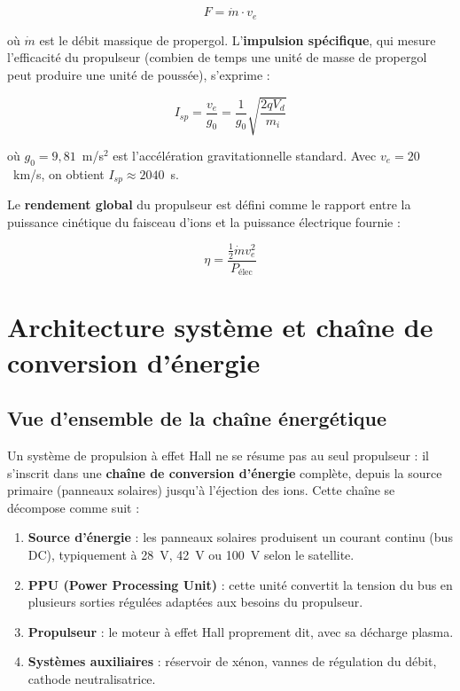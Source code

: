 \documentclass[12pt,a4paper]{article}
\begin{document}
\begin{equation}
F = \dot{m} \cdot v_e
\end{equation}

où $\dot{m}$ est le débit massique de propergol. L'\textbf{impulsion spécifique}, qui mesure l'efficacité du propulseur (combien de temps une unité de masse de propergol peut produire une unité de poussée), s'exprime :

\begin{equation}
I_{sp} = \frac{v_e}{g_0} = \frac{1}{g_0}\sqrt{\frac{2 q V_d}{m_i}}
\end{equation}

où $g_0 = 9{,}81$~m/s$^2$ est l'accélération gravitationnelle standard. Avec $v_e = 20$~km/s, on obtient $I_{sp} \approx 2040$~s.

Le \textbf{rendement global} du propulseur est défini comme le rapport entre la puissance cinétique du faisceau d'ions et la puissance électrique fournie :

\begin{equation}
\eta = \frac{\frac{1}{2}\dot{m} v_e^2}{P_{\text{élec}}}
\end{equation}

\section{Architecture système et chaîne de conversion d'énergie}

\subsection{Vue d'ensemble de la chaîne énergétique}

Un système de propulsion à effet Hall ne se résume pas au seul propulseur : il s'inscrit dans une \textbf{chaîne de conversion d'énergie} complète, depuis la source primaire (panneaux solaires) jusqu'à l'éjection des ions. Cette chaîne se décompose comme suit :

\begin{enumerate}
    \item \textbf{Source d'énergie} : les panneaux solaires produisent un courant continu (bus DC), typiquement à 28~V, 42~V ou 100~V selon le satellite.
    \item \textbf{PPU (Power Processing Unit)} : cette unité convertit la tension du bus en plusieurs sorties régulées adaptées aux besoins du propulseur.
    \item \textbf{Propulseur} : le moteur à effet Hall proprement dit, avec sa décharge plasma.
    \item \textbf{Systèmes auxiliaires} : réservoir de xénon, vannes de régulation du débit, cathode neutralisatrice.
\end{enumerate}
\end{document}
